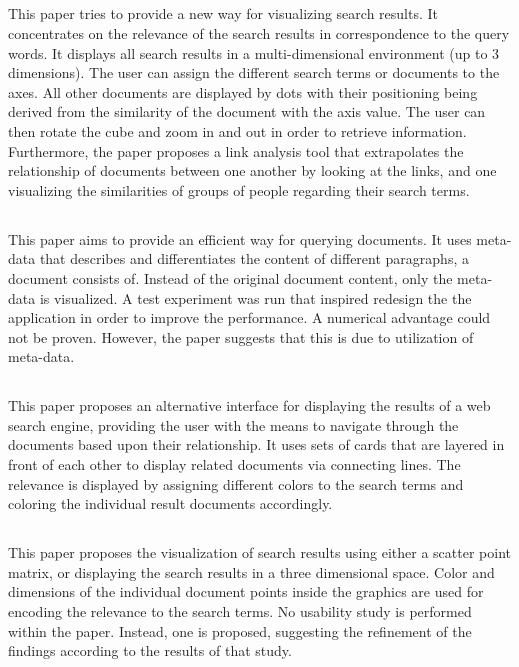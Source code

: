 \subsection{\cite{Konchady1998}}
This paper tries to provide a new way for visualizing search results. It concentrates on the relevance of the search results in correspondence to the query words. It displays all search results in a multi-dimensional environment (up to 3 dimensions). The user can assign the different search terms or documents to the axes. All other documents are displayed by dots with their positioning being derived from the similarity of the document with the axis value. The user can then rotate the cube and zoom in and out in order to retrieve information. Furthermore, the paper proposes a link analysis tool that extrapolates the relationship of documents between one another by looking at the links, and one visualizing the similarities of groups of people regarding their search terms.

\subsection{\cite{Weiss2001}}
This paper aims to provide an efficient way for querying documents. It uses meta-data that describes and differentiates the content of different paragraphs, a document consists of. Instead of the original document content, only the meta-data is visualized. A test experiment was run that inspired redesign the the application in order to improve the performance. A numerical advantage could not be proven. However, the paper suggests that this is due to utilization of meta-data.

\subsection{\cite{Mukherjea1999}}
This paper proposes an alternative interface for displaying the results of a web search engine, providing the user with the means to navigate through the documents based upon their relationship. It uses sets of cards that are layered in front of each other to display related documents via connecting lines. The relevance is displayed by assigning different colors to the search terms and coloring the individual result documents accordingly.

\subsection{\cite{Mukherjea1996}}
This paper proposes the visualization of search results using either a scatter point matrix, or displaying the search results in a three dimensional space. Color and dimensions of the individual document points inside the graphics are used for encoding the relevance to the search terms. No usability study is performed within the paper. Instead, one is proposed, suggesting the refinement of the findings according to the results of that study.


